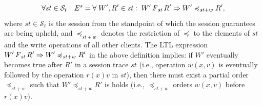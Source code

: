 \documentclass[journal,compsoc]{IEEEtran}
\begin{document}
\begin{align}
  \begin{split}
  \forall st \in \mathcal{S}_t \quad E^{s} = \forall \;  {W}', {R}' \in \mathit{st} : \;
  {W}' \operatorname{\it F}_\mathit{st} {R}'
 \Rightarrow 
 {W}' \preccurlyeq_{\mathit{st}+w} {R}',
  \end{split}
  \end{align}\label{eqn:RYW} where $\mathit{st}\in\mathcal{S}_t$ is the session from the standpoint of which the session guarantees are being upheld, and $\preccurlyeq_{\mathit{st}+w}$ denotes the restriction of $\preccurlyeq$ to the elements of $\mathit{st}$ and the write operations of all other clients. The LTL expression ${W}' \operatorname{\it F}_\mathit{st} {R}'
 \Rightarrow 
 {W}' \preccurlyeq_{\mathit{st}+w} {R}'$ in the above definition implies: if ${W}'$ eventually becomes true after ${R}'$ in a session trace $\mathit{st}$ (i.e., operation $w(x,v)$ is eventually followed by the operation  $r(x){v}$ in $\mathit{st}$), then there must exist a partial order $\preccurlyeq_{\mathit{st}+w}$ such that ${W}' \preccurlyeq_{\mathit{st}+w} {R}'$ is holds (i.e., $\preccurlyeq_{\mathit{st}+w}$ orders $w(x,v)$ before $r(x){v}$).  
\end{document}
